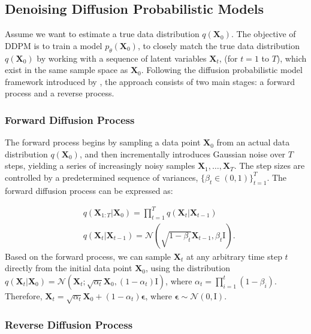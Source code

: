 \documentclass[11pt]{article}
\begin{document}
\subsection{Denoising Diffusion Probabilistic Models}\label{sec: ddpm}
Assume we want to estimate a true data distribution $q(\bm{X}_0)$. The objective of DDPM is to train a model $p_{\theta}(\bm{X}_0)$, to closely match the true data distribution $q(\bm{X}_0)$ by working with a sequence of latent variables $\bm{X}_t$, (for $t=1$ to $T$), which exist in the same sample space as $\bm{X}_0$. Following the diffusion probabilistic model framework introduced by \citet{ho2020denoising}, the approach consists of two main stages: a forward process and a reverse process.
\subsubsection*{Forward Diffusion Process}
The forward process begins by sampling a data point $\bm{X}_0$ from an actual data distribution $q(\bm{X}_0)$, and then incrementally introduces Gaussian noise over $T$ steps, yielding a series of increasingly noisy samples $\bm{X}_1,\ldots,\bm{X}_T$. The step sizes are controlled by a predetermined sequence of variances, $\{\beta_t\in(0,1)\}_{t=1}^T$. The forward diffusion process can be expressed as:


\begin{align}\label{eq: forward diffusion}
	&q(\bm{X}_{1:T}|\bm{X}_0)=\prod_{t=1}^{T}q(\bm{X}_t|\bm{X}_{t-1})\\
	&q(\bm{X}_t|\bm{X}_{t-1})=\mathcal{N}(\sqrt{1-\beta_t}\bm{X}_{t-1}, \beta_t\bm{\mathrm{I}}).
\end{align}
Based on the forward process, we can sample $\bm{X}_t$ at any arbitrary time step $t$ directly from the initial data point $\bm{X}_0$, using the distribution $q(\bm{X}_t|\bm{X}_0)=\mathcal{N}(\bm{X}_t;\sqrt{\alpha_t}\bm{X}_0, (1-\alpha_t)\bm{\mathrm{I}})$, where $\alpha_t=\prod_{i=1}^t (1-\beta_i)$.  Therefore, $\bm{X}_t=\sqrt{\alpha_t}\bm{X}_0+(1-\alpha_t)\bm{\epsilon}$, where $\bm{\epsilon}\sim \mathcal{N}(0, \bm{\mathrm{I}})$. 


\subsubsection*{Reverse Diffusion Process}
\end{document}
